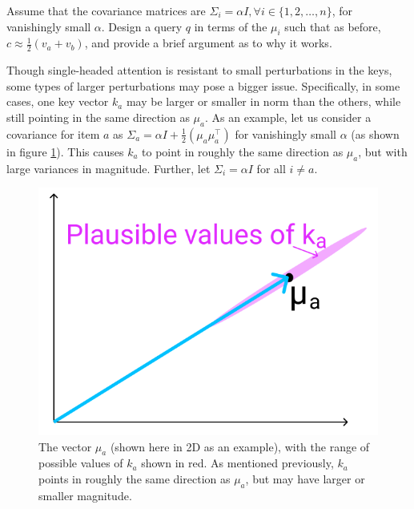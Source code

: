 \begin{parts}
\begin{subparts}
\subpart[2] Assume that the covariance matrices are $\Sigma_i = \alpha I, \forall i \in \{1, 2, \ldots, n\}$, for vanishingly small $\alpha$.
Design a query $q$ in terms of the $\mu_i$ such that as before, $c\approx \frac{1}{2}(v_a + v_b)$, and provide a brief argument as to why it works.


\subpart[3] Though single-headed attention is resistant to small perturbations in the keys, some types of larger perturbations may pose a bigger issue. Specifically, in some cases, one key vector $k_a$ may be larger or smaller in norm than the others, while still pointing in the same direction as $\mu_a$. As an example, let us consider a covariance for item $a$ as $\Sigma_a = \alpha I + \frac{1}{2}(\mu_a\mu_a^\top)$ for vanishingly small $\alpha$ (as shown in figure \ref{ka_plausible}). This causes $k_a$ to point in roughly the same direction as $\mu_a$, but with large variances in magnitude. Further, let $\Sigma_i = \alpha I$ for all $i \neq a$. %
\begin{figure}[h]
\centering
\captionsetup{justification=centering,margin=2cm}
\includegraphics[width=0.35\linewidth]{images/ka_plausible.png}
\caption{The vector $\mu_a$ (shown here in 2D as an example), with the range of possible values of $k_a$ shown in red. As mentioned previously, $k_a$ points in roughly the same direction as $\mu_a$, but may have larger or smaller magnitude.}
\label{ka_plausible}
\end{figure}


\end{subparts}
\end{parts}
